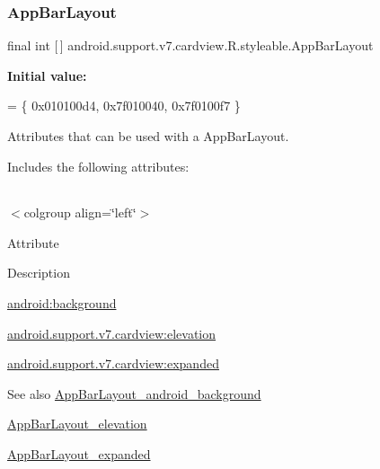 \subsubsection{\texorpdfstring{App\+Bar\+Layout}{AppBarLayout}}
{\footnotesize\ttfamily final int \mbox{[}$\,$\mbox{]} android.\+support.\+v7.\+cardview.\+R.\+styleable.\+App\+Bar\+Layout\hspace{0.3cm}{\ttfamily [static]}}

{\bfseries Initial value\+:}
\begin{DoxyCode}
= \{
            0x010100d4, 0x7f010040, 0x7f0100f7
        \}
\end{DoxyCode}
Attributes that can be used with a App\+Bar\+Layout. 

Includes the following attributes\+:

\tabulinesep=1mm
\begin{longtabu} spread 0pt [c]{*{0}{|X[-1]}|}
\hline
\end{longtabu}
$<$colgroup align=\char`\"{}left\char`\"{}$>$ 

Attribute

Description 

{\ttfamily \hyperlink{classandroid_1_1support_1_1v7_1_1cardview_1_1R_1_1styleable_a4d45203e5c11f7828d22760555de2f5a}{android\+:background}}

{\ttfamily \hyperlink{classandroid_1_1support_1_1v7_1_1cardview_1_1R_1_1styleable_a405d6ed7804434784f1f7baf4ccfe842}{android.\+support.\+v7.\+cardview\+:elevation}}

{\ttfamily \hyperlink{classandroid_1_1support_1_1v7_1_1cardview_1_1R_1_1styleable_a25a66e2f26717d1b0034f4cad6a32780}{android.\+support.\+v7.\+cardview\+:expanded}}

\begin{DoxySeeAlso}{See also}
\hyperlink{classandroid_1_1support_1_1v7_1_1cardview_1_1R_1_1styleable_a4d45203e5c11f7828d22760555de2f5a}{App\+Bar\+Layout\+\_\+android\+\_\+background} 

\hyperlink{classandroid_1_1support_1_1v7_1_1cardview_1_1R_1_1styleable_a405d6ed7804434784f1f7baf4ccfe842}{App\+Bar\+Layout\+\_\+elevation} 

\hyperlink{classandroid_1_1support_1_1v7_1_1cardview_1_1R_1_1styleable_a25a66e2f26717d1b0034f4cad6a32780}{App\+Bar\+Layout\+\_\+expanded} 
\end{DoxySeeAlso}
\mbox{\label{classandroid_1_1support_1_1v7_1_1cardview_1_1R_1_1styleable_a4d45203e5c11f7828d22760555de2f5a}} 
